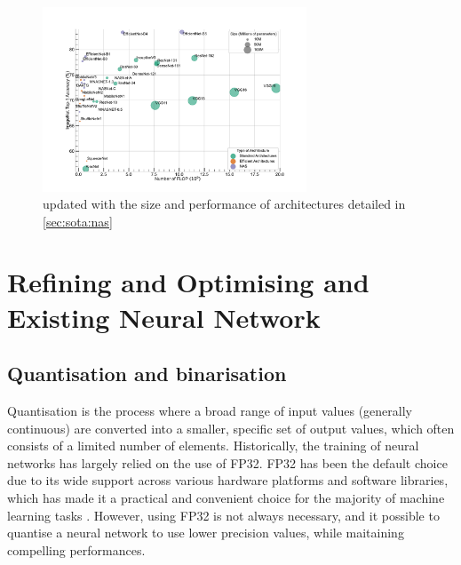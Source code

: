 \begin{figure}[htbp]
    \centering
    \includegraphics[width=0.70\textwidth]{chapter_sota/assets/network_sizes_normal_eff_nas.pdf}
    \caption{ updated with the size and
    performance of architectures detailed in \cref{sec:sota:nas}}
    \label{fig:sota:net_sizes_std_eff_nas}
\end{figure}


\section{Refining and Optimising and Existing Neural Network}


\subsection{Quantisation and binarisation}

Quantisation is the process where a broad range of input values (generally
continuous) are converted into a smaller, specific set of output values, which
often consists of a limited number of elements. Historically, the training of
neural networks has largely relied on the use of \ac{FP32}. FP32 has been the
default choice due to its wide support across various hardware platforms and
software libraries, which has made it a practical and convenient choice for the
majority of machine learning tasks \cite{sze2017efficient}. However, using
\acl{FP32} is not always necessary, and it possible to quantise a neural network
to use lower precision values, while maitaining compelling performances. \\

